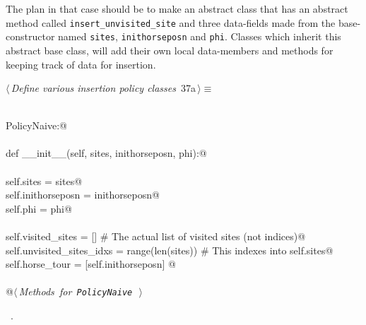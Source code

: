 \documentclass[11.5pt]{report}
\begin{document}
The plan in that case should be to make an abstract class that 
has an abstract method called \texttt{insert\_unvisited\_site}
and three data-fields made from the base-constructor named \texttt{sites}, \texttt{inithorseposn}
and \texttt{phi}. Classes which inherit this abstract base class, will 
add their own local data-members and methods for keeping track of 
data for insertion. 

\begin{flushleft} \small\label{scrap32}\raggedright\small
{} $\langle\,${\itshape Define various insertion policy classes}\nobreak\ {\footnotesize {37a}}$\,\rangle\equiv$
\vspace{-1ex}
\begin{list}{}{} \item
\mbox{}\verb@@\\
\mbox{}\verb@class PolicyNaive:@\\
\mbox{}\verb@@\\
\mbox{}\verb@    def __init__(self, sites, inithorseposn, phi):@\\
\mbox{}\verb@@\\
\mbox{}\verb@         self.sites           = sites@\\
\mbox{}\verb@         self.inithorseposn   = inithorseposn@\\
\mbox{}\verb@         self.phi             = phi@\\
\mbox{}\verb@@\\
\mbox{}\verb@         self.visited_sites        = []                # The actual list of visited sites (not indices)@\\
\mbox{}\verb@         self.unvisited_sites_idxs = range(len(sites)) # This indexes into self.sites@\\
\mbox{}\verb@         self.horse_tour           = [self.inithorseposn]         @\\
\mbox{}\verb@@\\
\mbox{}\verb@    @\hbox{$\langle\,${\itshape Methods for \verb|PolicyNaive|}\nobreak\ {\footnotesize {}}$\,\rangle$}\verb@@\\
\mbox{}\verb@@{\NWsep}
\end{list}
\vspace{-1.5ex}
\footnotesize
\begin{list}{}{\setlength{\itemsep}{-\parsep}\setlength{\itemindent}{-\leftmargin}}
\item \NWtxtMacroRefIn\ .

\item{}
\end{list}
\vspace{4ex}
\end{flushleft}
\end{document}
